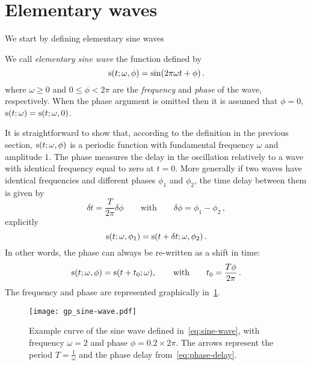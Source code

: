 \section{Elementary waves}
We start by defining elementary sine waves
\begin{definition}
  We call \emph{elementary sine wave} the function defined by
  \begin{equation}
    \mathrm{s}(t;\omega,\phi)=\sin(2\pi\omega t + \phi)\,.\label{eq:sine-wave}
  \end{equation}
  where $\omega\geq 0$ and $0\leq\phi<2\pi$ are the \emph{frequency} and \emph{phase} of
  the wave, respectively. When the phase argument is omitted then it is assumed that
  $\phi=0$, \ie $\mathrm{s}(t;\omega)=\mathrm{s}(t;\omega,0)$.
\end{definition}
\noindent It is straightforward to show that, according to the definition in the previous
section, $\mathrm{s}(t;\omega,\phi)$ is a periodic function with fundamental frequency $\omega$
and amplitude $1$. The phase measures the delay in the oscillation relatively to a wave
with identical frequency equal to zero at $t=0$. More generally if two waves have
identical frequencies and different phases $\phi_1$ and $\phi_2$, the time delay between
them is given by
\begin{equation}
  \delta t =\frac{T}{2\pi}\delta\phi\qquad\text{with}\qquad\delta\phi=\phi_1-\phi_2\,,
\end{equation}
explicitly
\begin{equation}
  \mathrm{s}(t;\omega,\phi_1)=\mathrm{s}(t+\delta t;\omega,\phi_2)\,.
\end{equation}
In other words, the phase can always be re-written as a shift in time:
\begin{equation}
  \mathrm{s}(t;\omega,\phi)=\mathrm{s}(t+t_0;\omega),
  \qquad\text{with}\qquad
  t_0 = \frac{T\phi}{2\pi}\,.\label{eq:phase-delay}
\end{equation}
The frequency and phase are represented graphically in~\cref{fig:sine-wave}.
\begin{figure}[t]
  \centering
  \texttt{[image: gp\_sine-wave.pdf]}
  \caption{Example curve of the sine wave defined in~\cref{eq:sine-wave}, with frequency $\omega=2$ and phase $\phi=0.2\times 2\pi$. The arrows represent the period $T=\frac{1}{\omega}$ and the phase delay from~\cref{eq:phase-delay}.}
  \label{fig:sine-wave}
\end{figure}

